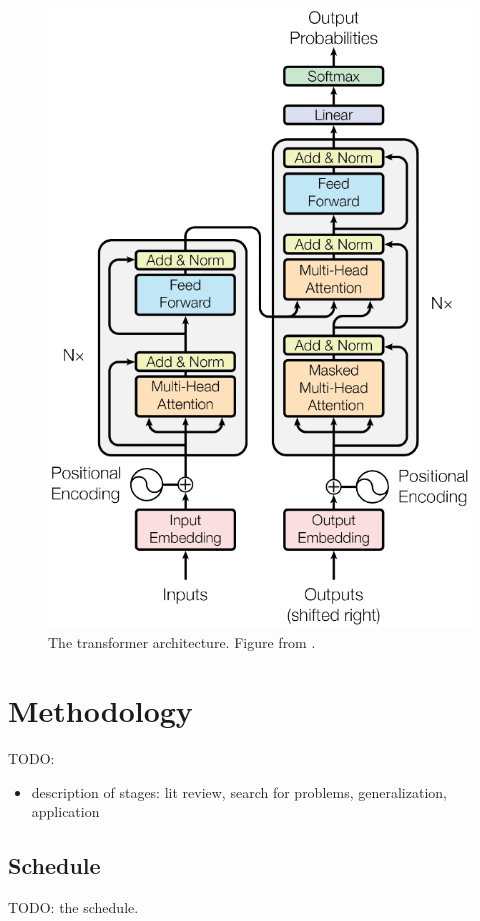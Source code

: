 \documentclass[English]{style/ic-tese-v3}
\begin{document}
\begin{figure}
\begin{center}
    \includegraphics[width=0.4\linewidth]{./img/transformer.png}
\caption{
    The transformer architecture.
    Figure from \cite{ref:transformer}.
}
\label{fig:transformer}
\end{center}
\end{figure}

\let\clearpage\relax
\newpage

\chapter{Methodology}
TODO:
\begin{itemize}
    \item description of stages: lit review,
        search for problems, generalization, application
\end{itemize}

\section{Schedule}
TODO: the schedule.

\renewcommand\bibname{References\vspace*{10mm}}

\begingroup
\let\clearpage\relax


\endgroup
\end{document}
